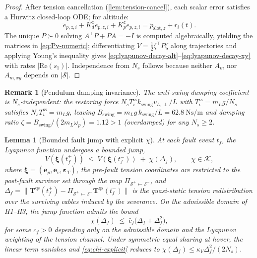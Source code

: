 \documentclass[lettersize,journal]{IEEEtran}
\newtheorem{lemma}{Lemma}%
\newtheorem{remark}{Remark}%
\newcommand{\vect}[1]{\boldsymbol{#1}}
\begin{document}
\begin{proof}
After tension cancellation (\cref{lem:tension-cancel}), each scalar error satisfies a Hurwitz closed-loop ODE; for altitude:
\begin{equation}
  \ddot{e}_{p,z,i} + K_d^z \dot{e}_{p,z,i} + K_p^z e_{p,z,i}
    = \ddot{p}_{\mathrm{slot},z} + r_i(t).
  \label{eq:alt-error-ode}
\end{equation}
The unique $P \succ 0$ solving $A^\top P + PA = -I$ is computed algebraically, yielding the matrices in \eqref{eq:Pv-numeric}; differentiating $V = \tfrac{1}{2}\zeta^\top P\zeta$ along trajectories and applying Young's inequality gives \eqref{eq:lyapunov-decay-alt}--\eqref{eq:lyapunov-decay-xy} with rates $|\mathrm{Re}(s_1)|$. Independence from $N_s$ follows because neither $A_m$ nor $A_{m,xy}$ depends on $|\mathcal{S}|$.
\end{proof}

\begin{remark}[Pendulum damping invariance]
\label{lem:antiswing-invariant}
The anti-swing damping coefficient is $N_s$-independent: the
restoring force $N_s T_i^{\mathrm{ss}} k_{\mathrm{swing}}
v_{L,\perp}/L$ with $T_i^{\mathrm{ss}} = m_L g/N_s$ satisfies
$N_s T_i^{\mathrm{ss}} = m_L g$, leaving $B_{\mathrm{swing}} =
m_L g\,k_{\mathrm{swing}}/L = \SI{62.8}{\newton\second\per\metre}$
and damping ratio $\zeta = B_{\mathrm{swing}}/(2m_L\omega_p)
= 1.12 > 1$ (overdamped) for any $N_s \ge 2$.
\end{remark}

\begin{lemma}[Bounded fault jump with explicit $\chi$]
\label{lem:jump-continuity}
At each fault event $t_f$, the Lyapunov function undergoes a
bounded jump,
\begin{equation}
  V(\vect\xi(t_f^+))
    \;\le\;
    V(\vect\xi(t_f^-))
    \;+\; \chi(\Delta_f),
  \qquad
  \chi \in \mathcal{K},
  \label{eq:jump-bound}
\end{equation}
where $\vect\xi = (\vect e_p, \vect e_v, \vect\varepsilon_T)$, the pre-fault tension coordinates are restricted to the
post-fault survivor set through the map
$\Pi_{\mathcal{S}^+\leftarrow\mathcal{S}^-}$, and
$\Delta_f = \|\vect T^{\mathrm{qs}}(t_f^+) -
\Pi_{\mathcal{S}^+\leftarrow\mathcal{S}^-}
\vect T^{\mathrm{qs}}(t_f^-)\|$ is the quasi-static tension
redistribution over the surviving cables induced by the
severance. On the admissible domain of H1--H3, the jump
function admits the bound
\begin{equation}
  \chi(\Delta_f)
    \;\le\;
    \bar c_f\bigl(\Delta_f + \Delta_f^2\bigr),
  \label{eq:chi-explicit}
\end{equation}
for some $\bar c_f > 0$ depending only on the admissible
domain and the Lyapunov weighting of the tension channel.
Under symmetric equal sharing at hover, the linear term
vanishes and \eqref{eq:chi-explicit} reduces to
$\chi(\Delta_f) \le \kappa_V\Delta_f^2/(2N_s)$.
\end{lemma}
\end{document}
